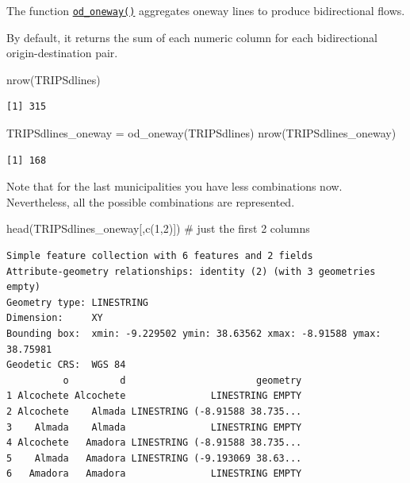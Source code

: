 \documentclass[
  letterpaper,
  DIV=11,
  numbers=noendperiod]{scrreprt}
\newenvironment{Shaded}{\begin{snugshade}}{\end{snugshade}}
\newcommand{\CommentTok}[1]{\textcolor[rgb]{0.37,0.37,0.37}{#1}}
\newcommand{\DecValTok}[1]{\textcolor[rgb]{0.68,0.00,0.00}{#1}}
\newcommand{\FunctionTok}[1]{\textcolor[rgb]{0.28,0.35,0.67}{#1}}
\newcommand{\NormalTok}[1]{\textcolor[rgb]{0.00,0.23,0.31}{#1}}
\newcommand{\OtherTok}[1]{\textcolor[rgb]{0.00,0.23,0.31}{#1}}
\begin{document}
The function
\href{https://itsleeds.github.io/od/reference/od_oneway.html}{\texttt{od\_oneway()}}
aggregates oneway lines to produce bidirectional flows.

By default, it returns the sum of each numeric column for each
bidirectional origin-destination pair.

\begin{Shaded}
\begin{Highlighting}[]
\FunctionTok{nrow}\NormalTok{(TRIPSdlines)}
\end{Highlighting}
\end{Shaded}

\begin{verbatim}
[1] 315
\end{verbatim}

\begin{Shaded}
\begin{Highlighting}[]
\NormalTok{TRIPSdlines\_oneway }\OtherTok{=} \FunctionTok{od\_oneway}\NormalTok{(TRIPSdlines)}
\FunctionTok{nrow}\NormalTok{(TRIPSdlines\_oneway)}
\end{Highlighting}
\end{Shaded}

\begin{verbatim}
[1] 168
\end{verbatim}

Note that for the last municipalities you have less combinations now.
Nevertheless, all the possible combinations are represented.

\begin{Shaded}
\begin{Highlighting}[]
\FunctionTok{head}\NormalTok{(TRIPSdlines\_oneway[,}\FunctionTok{c}\NormalTok{(}\DecValTok{1}\NormalTok{,}\DecValTok{2}\NormalTok{)]) }\CommentTok{\# just the first 2 columns}
\end{Highlighting}
\end{Shaded}

\begin{verbatim}
Simple feature collection with 6 features and 2 fields
Attribute-geometry relationships: identity (2) (with 3 geometries empty)
Geometry type: LINESTRING
Dimension:     XY
Bounding box:  xmin: -9.229502 ymin: 38.63562 xmax: -8.91588 ymax: 38.75981
Geodetic CRS:  WGS 84
          o         d                       geometry
1 Alcochete Alcochete               LINESTRING EMPTY
2 Alcochete    Almada LINESTRING (-8.91588 38.735...
3    Almada    Almada               LINESTRING EMPTY
4 Alcochete   Amadora LINESTRING (-8.91588 38.735...
5    Almada   Amadora LINESTRING (-9.193069 38.63...
6   Amadora   Amadora               LINESTRING EMPTY
\end{verbatim}
\end{document}
